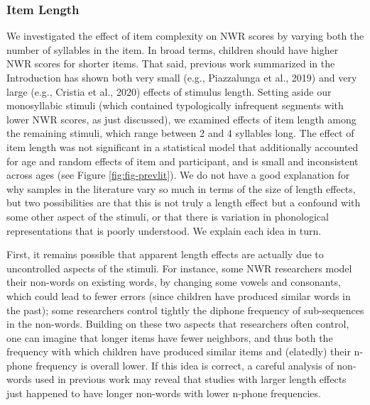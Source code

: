 \documentclass[english,,man,floatsintext]{apa6}
\begin{document}
\hypertarget{item-length}{%
\subsubsection{Item Length}\label{item-length}}

We investigated the effect of item complexity on NWR scores by varying both the number of syllables in the item. In broad terms, children should have higher NWR scores for shorter items. That said, previous work summarized in the Introduction has shown both very small (e.g., Piazzalunga et al., 2019) and very large (e.g., Cristia et al., 2020) effects of stimulus length. Setting aside our monosyllabic stimuli (which contained typologically infrequent segments with lower NWR scores, as just discussed), we examined effects of item length among the remaining stimuli, which range between 2 and 4 syllables long. The effect of item length was not significant in a statistical model that additionally accounted for age and random effects of item and participant, and is small and inconsistent across ages (see Figure \ref{fig:fig-prevlit}). We do not have a good explanation for why samples in the literature vary so much in terms of the size of length effects, but two possibilities are that this is not truly a length effect but a confound with some other aspect of the stimuli, or that there is variation in phonological representations that is poorly understood. We explain each idea in turn.

First, it remains possible that apparent length effects are actually due to uncontrolled aspects of the stimuli. For instance, some NWR researchers model their non-words on existing words, by changing some vowels and consonants, which could lead to fewer errors (since children have produced similar words in the past); some researchers control tightly the diphone frequency of sub-sequences in the non-words. Building on these two aspects that researchers often control, one can imagine that longer items have fewer neighbors, and thus both the frequency with which children have produced similar items and (elatedly) their n-phone frequency is overall lower. If this idea is correct, a careful analysis of non-words used in previous work may reveal that studies with larger length effects just happened to have longer non-words with lower n-phone frequencies.
\end{document}
